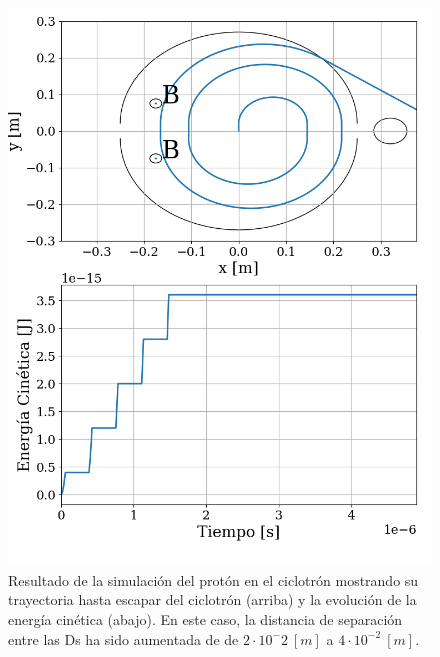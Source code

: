 \documentclass[journal]{IEEEtran}
\begin{document}
\begin{figure}[!htb]
    \centering
    \includegraphics[width=0.9\linewidth]{ciclotron_simulacion_d4.png}
    \caption{Resultado de la simulación del protón en el ciclotrón mostrando su trayectoria hasta escapar del ciclotrón (arriba) y la evolución de la energía cinética (abajo). En este caso, la distancia de separación entre las Ds ha sido aumentada de de $2\cdot 10^-2~[m]$ a $4\cdot 10^{-2}~[m]$.}
    \label{fig:ciclotron_simulacion_d4}
\end{figure}
\end{document}

